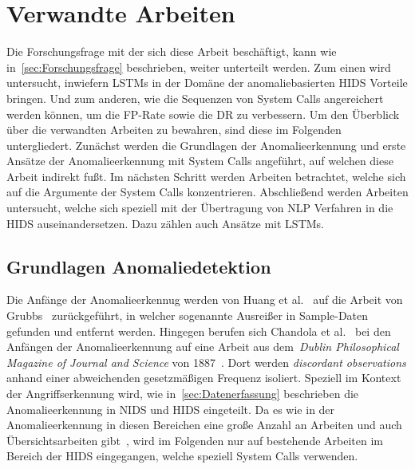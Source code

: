 \chapter{Verwandte Arbeiten}\label{ch:verwandte_arbeiten}

Die Forschungsfrage mit der sich diese Arbeit beschäftigt, kann wie in~\autoref{sec:Forschungsfrage} beschrieben, weiter unterteilt werden.
Zum einen wird untersucht, inwiefern \acp{LSTM} in der Domäne der anomaliebasierten \ac{HIDS} Vorteile bringen.
Und zum anderen, wie die Sequenzen von System Calls angereichert werden können, um die \acf{FP}-Rate sowie die \acf{DR} zu verbessern.
Um den Überblick über die verwandten Arbeiten zu bewahren, sind diese im Folgenden untergliedert.
Zunächst werden die Grundlagen der Anomalieerkennung und erste Ansätze der Anomalieerkennung mit System Calls angeführt, auf welchen diese Arbeit indirekt fußt.
Im nächsten Schritt werden Arbeiten betrachtet, welche sich auf die Argumente der System Calls konzentrieren.
Abschließend werden Arbeiten untersucht, welche sich speziell mit der Übertragung von \ac{NLP} Verfahren in die \ac{HIDS} auseinandersetzen.
Dazu zählen auch Ansätze mit \acp{LSTM}.

    \section{Grundlagen Anomaliedetektion}

        Die Anfänge der Anomalieerkennug werden von Huang et al.~\cite{ANOMALYBOOKKISHAN2017} auf die Arbeit von Grubbs~\cite{ANOMALYDEFINITION1969} zurückgeführt, in welcher sogenannte Ausreißer in Sample-Daten gefunden und entfernt werden.
        Hingegen berufen sich Chandola et al.~\cite{ANOMALYSURVEY} bei den Anfängen der Anomalieerkennung auf eine Arbeit aus dem~\textit{Dublin Philosophical Magazine of Journal and Science} von 1887~\cite{ANOMALYDEFINITION1887}.
        Dort werden \textit{discordant observations} anhand einer abweichenden gesetzmäßigen Frequenz isoliert. 
        Speziell im Kontext der Angriffserkennung wird, wie in~\autoref{sec:Datenerfassung} beschrieben die Anomalieerkennung in \ac{NIDS} und \ac{HIDS} eingeteilt.
        Da es wie in der Anomalieerkennung in diesen Bereichen eine große Anzahl an Arbeiten und auch Übersichtsarbeiten gibt~\cite{ANOMALYSURVEY, ANOMALYSURVEY2, ANOMALYSURVEY3}, wird im Folgenden nur auf bestehende Arbeiten im Bereich der \ac{HIDS} eingegangen, welche speziell System Calls verwenden.

